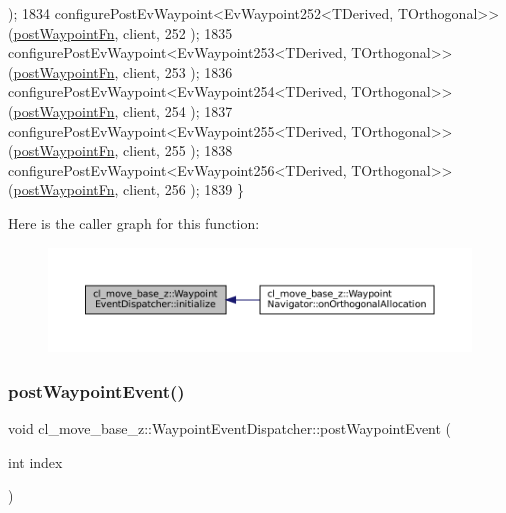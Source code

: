 \begin{DoxyCode}
      );
1834     configurePostEvWaypoint<EvWaypoint252<TDerived, TOrthogonal>>(\hyperlink{classcl__move__base__z_1_1WaypointEventDispatcher_a964a57fcce5d48ec60243230722d8dd7}{postWaypointFn}, client, 252
      );
1835     configurePostEvWaypoint<EvWaypoint253<TDerived, TOrthogonal>>(\hyperlink{classcl__move__base__z_1_1WaypointEventDispatcher_a964a57fcce5d48ec60243230722d8dd7}{postWaypointFn}, client, 253
      );
1836     configurePostEvWaypoint<EvWaypoint254<TDerived, TOrthogonal>>(\hyperlink{classcl__move__base__z_1_1WaypointEventDispatcher_a964a57fcce5d48ec60243230722d8dd7}{postWaypointFn}, client, 254
      );
1837     configurePostEvWaypoint<EvWaypoint255<TDerived, TOrthogonal>>(\hyperlink{classcl__move__base__z_1_1WaypointEventDispatcher_a964a57fcce5d48ec60243230722d8dd7}{postWaypointFn}, client, 255
      );
1838     configurePostEvWaypoint<EvWaypoint256<TDerived, TOrthogonal>>(\hyperlink{classcl__move__base__z_1_1WaypointEventDispatcher_a964a57fcce5d48ec60243230722d8dd7}{postWaypointFn}, client, 256
      );
1839 \}
\end{DoxyCode}
Here is the caller graph for this function\+:
\nopagebreak
\begin{figure}[H]
\begin{center}
\leavevmode
\includegraphics[width=350pt]{classcl__move__base__z_1_1WaypointEventDispatcher_a89674461d32af85dd64ca49290dbd010_icgraph}
\end{center}
\end{figure}
\mbox{\label{classcl__move__base__z_1_1WaypointEventDispatcher_a6462eae610b97df2207ecd93c1544aaf}} 
\subsubsection{\texorpdfstring{post\+Waypoint\+Event()}{postWaypointEvent()}}
{\footnotesize\ttfamily void cl\+\_\+move\+\_\+base\+\_\+z\+::\+Waypoint\+Event\+Dispatcher\+::post\+Waypoint\+Event (\begin{DoxyParamCaption}\item[{int}]{index }\end{DoxyParamCaption})}



